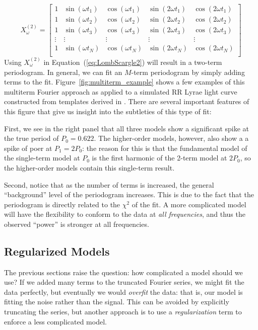 \documentclass[12pt,preprint]{aastex}
\newcommand{\Fig}[1]{Figure~\ref{fig:#1}}
\newcommand{\fig}[1]{\Fig{#1}}
\newcommand{\Eq}[1]{Equation~(\ref{eq:#1})}
\newcommand{\eq}[1]{\Eq{#1}}
\newcommand{\sectlabel}[1]{\label{sect:#1}}
\begin{document}
\begin{equation}
X_\omega^{(2)} = \left[
\begin{array}{ccccc}
1 & \sin(\omega t_1) & \cos(\omega t_1) & \sin(2\omega t_1) & \cos(2\omega t_1)\\
1 & \sin(\omega t_2) & \cos(\omega t_2) & \sin(2\omega t_2) & \cos(2\omega t_2)\\
1 & \sin(\omega t_3) & \cos(\omega t_3) & \sin(2\omega t_3) & \cos(2\omega t_3)\\
\vdots & \vdots & \vdots & \vdots & \vdots \\
1 & \sin(\omega t_N) & \cos(\omega t_N) & \sin(2\omega t_N) & \cos(2\omega t_N)\\
\end{array}
\right]
\end{equation}
Using $X_\omega^{(2)}$ in \eq{LombScargle2} will result in a two-term periodogram. In general, we can fit an $M$-term periodogram by simply adding terms to the fit. \fig{multiterm_example} shows a few examples of this multiterm Fourier approach as applied to a simulated RR Lyrae light curve constructed from templates derived in \citet{Sesar2010}. There are several important features of this figure that give us insight into the subtleties of this type of fit:

First, we see in the right panel that all three models show a significant spike at the true period of $P_0 = 0.622$. The higher-order models, however, also show a a spike of poer at $P_1 = 2 P_0$: the reason for this is that the fundamental model of the single-term model at $P_0$ is the first harmonic of the 2-term model at $2P_0$, so the higher-order models contain this single-term result.

Second, notice that as the number of terms is increased, the general ``background'' level of the periodogram increases. This is due to the fact that the periodogram is directly related to the $\chi^2$ of the fit. A more complicated model will have the flexibility to conform to the data at {\it all frequencies}, and thus the observed ``power'' is stronger at all frequencies.

\subsection{Regularized Models}
\sectlabel{regularization}
The previous sections raise the question: how complicated a model should we use? If we added many terms to the truncated Fourier series, we might fit the data perfectly, but eventually we would {\it overfit} the data: that is, our model is fitting the noise rather than the signal. This can be avoided by explicitly truncating the series, but another approach is to use a {\it regularization} term to enforce a less complicated model.
\end{document}
